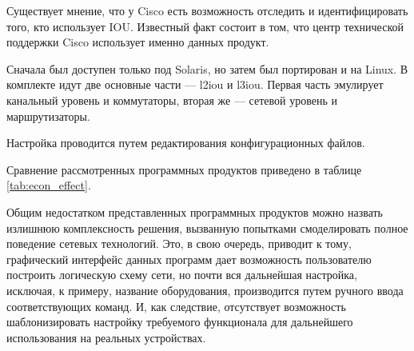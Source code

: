 	Существует мнение, что у Cisco есть возможность отследить и идентифицировать того, кто использует IOU.
	Известный факт состоит в том, что центр технической поддержки Cisco использует именно данных продукт.
	
	Сначала  был доступен только под Solaris, но затем был портирован и
	на Linux. В комплекте идут две основные части --- l2iou и l3iou. Первая часть эмулирует канальный уровень и коммутаторы, вторая же — сетевой уровень и маршрутизаторы.
	
	Настройка проводится путем редактирования конфигурационных файлов.%
	
%	
%	
%	
%	

	
	Сравнение рассмотренных программных продуктов приведено в таблице \ref{tab:econ_effect}.
	
	Общим недостатком представленных программных продуктов можно назвать излишнюю комплексность решения, вызванную попытками смоделировать полное поведение сетевых технологий. Это, в свою очередь, приводит к тому, графический интерфейс данных программ дает возможность пользователю построить логическую схему сети, но почти вся дальнейшая настройка, исключая, к примеру, название оборудования, производится путем ручного ввода соответствующих команд. И, как следствие,  отсутствует возможность шаблонизировать настройку требуемого функционала для дальнейшего использования на реальных устройствах.
	
